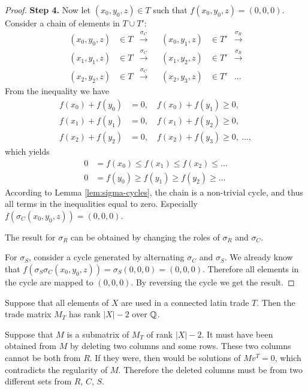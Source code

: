 \begin{proof}
%
%
\item \textbf{Step 4.}
Now let $(x_0,y_0,z) \in T$ such that $f(x_0,y_0,z)=(0,0,0)$. Consider a chain of elements in $T \cup T'$:
\begin{align*}
	(x_0,y_0,z) &\in T &\xrightarrow{\sigma_C}& &(x_0,y_1,z) &\in T' & \xrightarrow{\sigma_R} \\
	(x_1,y_1,z) &\in T &\xrightarrow{\sigma_C}& &(x_1,y_2,z) &\in T' & \xrightarrow{\sigma_R} \\
	(x_2,y_2,z) &\in T &\xrightarrow{\sigma_C}& &(x_2,y_3,z) &\in T' & \dots
\end{align*}
From the inequality we have
\begin{align*}
	f(x_0) + f(y_0) &= 0, \quad f(x_0) + f(y_1) \geq 0, \\
	f(x_1) + f(y_1) &= 0, \quad f(x_1) + f(y_2) \geq 0, \\
	f(x_2) + f(y_2) &= 0, \quad f(x_2) + f(y_3) \geq 0,\ \dots, 
\end{align*}
which yields
\begin{align*}
	0 &= f(x_0) \leq f(x_1) \leq f(x_2) \leq \dots \\
	0 &= f(y_0) \geq f(y_1) \geq f(y_2) \geq \dots
\end{align*}
According to Lemma \ref{lem:sigma-cycles}, the chain is a non-trivial cycle, and thus all terms in the inequalities equal to zero. Especially $f(\sigma_C(x_0,y_0,z)) = (0,0,0)$.

The result for $\sigma_R$ can be obtained by changing the roles of $\sigma_R$ and $\sigma_C$.

For $\sigma_S$, consider a cycle generated by alternating $\sigma_C$ and $\sigma_S$. We already know that $f(\sigma_S\sigma_C(x_0,y_0,z)) = \sigma_S(0,0,0) = (0,0,0)$. Therefore all elements in the cycle are mapped to $(0,0,0)$. By reversing the cycle we get the result.

\end{proof}

\begin{cor}
\label{cor:rank-mt}
Suppose that all elements of $X$ are used in a connected latin trade $T$. Then the trade matrix $M_T$ has rank $|X|-2$ over $\mathbb Q$.
\end{cor}

\begin{note}
Suppose that $M$ is a submatrix of $M_T$ of rank $|X|-2$. It must have been obtained from $M$ by deleting two columns and some rows. These two columns cannot be both from $R$. If they were, then
%
would be solutions of $Mv^T = 0$, which contradicts the regularity of $M$. Therefore the deleted columns must be from two different sets from $R$, $C$, $S$.
\end{note}


